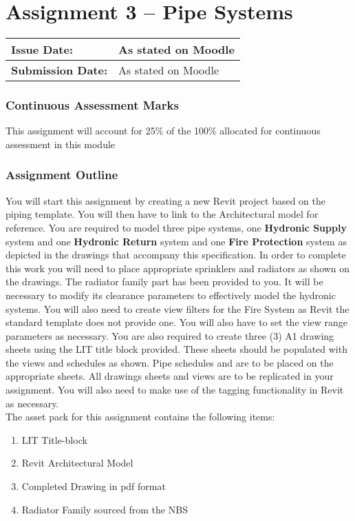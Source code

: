 
	
\part*{Assignment 3 – Pipe Systems}

\begin{tabularx}{\textwidth}{ |X|X| }
	\hline
	\textbf{Issue Date:} & As stated on Moodle \\
	\hline 
	\textbf{Submission Date:}  & As stated on Moodle  \\
	\hline
\end{tabularx}


\section*{Continuous Assessment Marks}
This assignment will account for 25\% of the 100\% allocated for continuous assessment in this module

\section*{Assignment Outline}
You will start this assignment by creating a new Revit project based on the piping template. You will then have to link to the Architectural model for reference.  You are required to model three pipe systems, one \textbf{Hydronic Supply} system and one \textbf{Hydronic Return} system and one \textbf{Fire Protection} system as depicted in the drawings that accompany this specification. In order to complete this work you will need to place appropriate sprinklers and radiators as shown on the drawings. The radiator family part has been provided to you. It will be necessary to modify its clearance parameters to effectively model the hydronic systems.  You will also need to create view filters for the Fire System as Revit the standard template does not provide one. You will also have to set the view range parameters as necessary.  You are also required to create three (3) A1 drawing sheets using the LIT title block provided. These sheets should be populated with the views and schedules as shown.  Pipe schedules and are to be placed on the appropriate sheets. All drawings sheets and views are to be replicated in your assignment. You will also need to make use of the tagging functionality in Revit as necessary.\\

The asset pack for this assignment contains the following items:
\begin{enumerate}
	\item LIT Title-block
	\item Revit Architectural Model
	\item Completed Drawing in pdf format
	\item Radiator Family sourced from the NBS
\end{enumerate}


